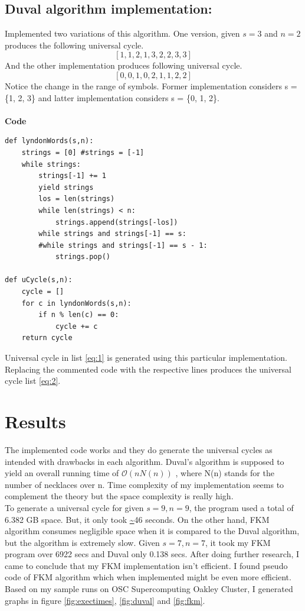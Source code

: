 \documentclass[12pt,twoside]{article}
\begin{document}
\subsection{Duval algorithm implementation:}
Implemented two variations of this algorithm. One version, given $s = 3$ and $n = 2$ produces the following universal cycle.
\begin{equation} \label{eq:1}
[1, 1, 2, 1, 3, 2, 2, 3, 3]
\end{equation}
And the other implementation produces following universal cycle.
\begin{equation} \label{eq:2}
[0, 0, 1, 0, 2, 1, 1, 2, 2]
\end{equation} 
Notice the change in the range of symbols. Former implementation considers s = \{1, 2, 3\} and latter implementation considers s = \{0, 1, 2\}. \\ \\
\textbf{Code}
\begin{verbatim}
def lyndonWords(s,n):
    strings = [0] #strings = [-1]
    while strings:
        strings[-1] += 1
        yield strings
        los = len(strings)
        while len(strings) < n:
            strings.append(strings[-los])
        while strings and strings[-1] == s: 
        #while strings and strings[-1] == s - 1: 
            strings.pop()

def uCycle(s,n):
    cycle = []
    for c in lyndonWords(s,n):
        if n % len(c) == 0:
            cycle += c
    return cycle

\end{verbatim}
Universal cycle in list \ref{eq:1} is generated using this particular implementation. Replacing the commented code with the respective lines produces the universal cycle list \ref{eq:2}.

\hfill \break
\hfill \break
\hfill \break
\section{Results}
The implemented code works and they do generate the universal cycles as intended with drawbacks in each algorithm. Duval's algorithm is supposed to yield an overall running time of $\mathcal{O}(nN(n))$ \cite{Berstel}, where N(n) stands for the number of necklaces over n. Time complexity of my implementation seems to complement the theory but the space complexity is really high. \\

To generate a universal cycle for given $s = 9, n = 9$, the program used a total of 6.382 GB space. But, it only took \url{~}46 seconds. On the other hand, FKM algorithm consumes negligible space when it is compared to the Duval algorithm, but the algorithm is extremely slow. Given $s = 7, n = 7$, it took my FKM program over 6922 secs and Duval only 0.138 secs. After doing further research, I came to conclude that my FKM implementation isn't efficient. I found pseudo code of FKM algorithm \cite{Savage} which when implemented might be even more efficient. Based on my sample runs on OSC Supercomputing Oakley Cluster, I generated graphs in figure \ref{fig:exectimes}, \ref{fig:duval} and \ref{fig:fkm}.
\end{document}

